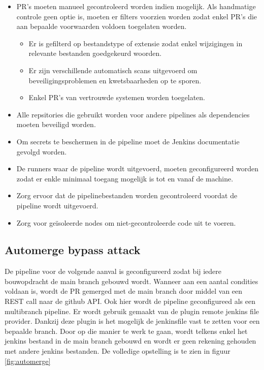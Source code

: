 \begin{itemize}
  \item PR's moeten manueel gecontroleerd worden indien mogelijk. Als handmatige controle geen optie is, moeten er filters voorzien worden zodat enkel PR's die aan bepaalde voorwaarden voldoen toegelaten worden.
  \begin{itemize}
    \item Er is gefilterd op bestandstype of extensie zodat enkel wijzigingen in relevante bestanden goedgekeurd woorden.
    \item Er zijn verschillende automatisch scans uitgevoerd om beveiligingsproblemen en kwetsbaarheden op te sporen.
    \item Enkel PR's van vertrouwde systemen worden toegelaten. 
  \end{itemize}
  \item Alle repsitories die gebruikt worden voor andere pipelines als dependencies moeten beveiligd worden.
  \item Om secrets te beschermen in de pipeline moet de Jenkins documentatie gevolgd worden.
  \item De runners waar de pipeline wordt uitgevoerd, moeten geconfigureerd worden zodat er enkle minimaal toegang mogelijk is tot en vanaf de machine.
  \item Zorg ervoor dat de pipelinebestanden worden gecontroleerd voordat de pipeline wordt uitgevoerd.
  \item Zorg voor geïsoleerde nodes om niet-gecontroleerde code uit te voeren.
\end{itemize}

\subsection{
{Automerge bypass attack}}
\label{sec:Automerge bypass aanval}

De pipeline voor de volgende aanval is geconfigureerd zodat bij iedere bouwopdracht de main branch gebouwd wordt. Wanneer aan een aantal condities voldaan is, wordt de PR gemerged met de main branch door middel van een REST call naar de github API. Ook hier wordt de pipeline geconfigureed als een multibranch pipeline. Er wordt gebruik gemaakt van de plugin remote jenkins file provider. Dankzij deze plugin is het mogelijk de jenkinsfile vast te zetten voor een bepaalde branch. Door op die manier te werk te gaan, wordt telkens enkel het jenkins bestand in de main branch gebouwd en wordt er geen rekening gehouden met andere jenkins bestanden. De volledige opstelling is te zien in figuur \ref{fig:automerge}
\newline

